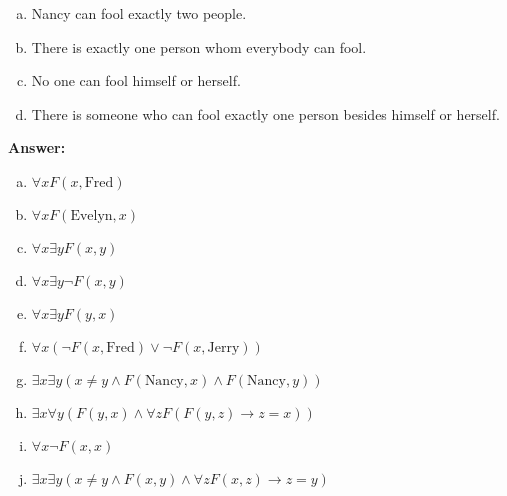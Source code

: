 \begin{itemize}
\begin{enumerate}[a.]
              \item Nancy can fool exactly two people.
              \item There is exactly one person whom everybody can fool.
              \item No one can fool himself or herself.
              \item There is someone who can fool exactly one person besides himself or herself.
          \end{enumerate}
          \textbf{Answer:}
          \begin{enumerate}[a.]
              \item $\forall xF(x, \text{Fred})$
              \item $\forall xF(\text{Evelyn}, x)$
              \item $\forall x \exists yF(x,y)$
              \item $\forall x \exists y \neg F(x,y)$
              \item $\forall x \exists y F(y, x)$
              \item $\forall x(\neg F(x, \text{Fred}) \lor \neg F(x, \text{Jerry}))$
              \item $\exists x \exists y (x \neq y \land F(\text{Nancy}, x) \land F(\text{Nancy}, y))$
              \item $\exists x \forall y (F(y, x) \land \forall zF(F(y,z) \to z = x))$
              \item $\forall x \neg F(x, x)$
              \item $\exists x \exists y (x \neq y \land F(x, y) \land \forall zF(x,z) \to z = y)$
          \end{enumerate}
\end{itemize}

